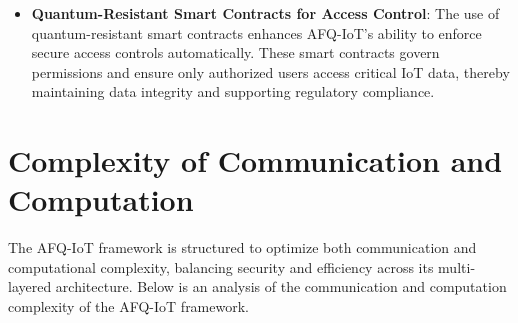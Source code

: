\documentclass[12pt, oneside]{report}
\begin{document}
\begin{itemize}
    \item \textbf{Quantum-Resistant Smart Contracts for Access Control}: The use of quantum-resistant smart contracts enhances AFQ-IoT’s ability to enforce secure access controls automatically. These smart contracts govern permissions and ensure only authorized users access critical IoT data, thereby maintaining data integrity and supporting regulatory compliance.

\end{itemize}

\section{Complexity of Communication and Computation}

The AFQ-IoT framework is structured to optimize both communication and computational complexity, balancing security and efficiency across its multi-layered architecture. Below is an analysis of the communication and computation complexity of the AFQ-IoT framework.
\end{document}
